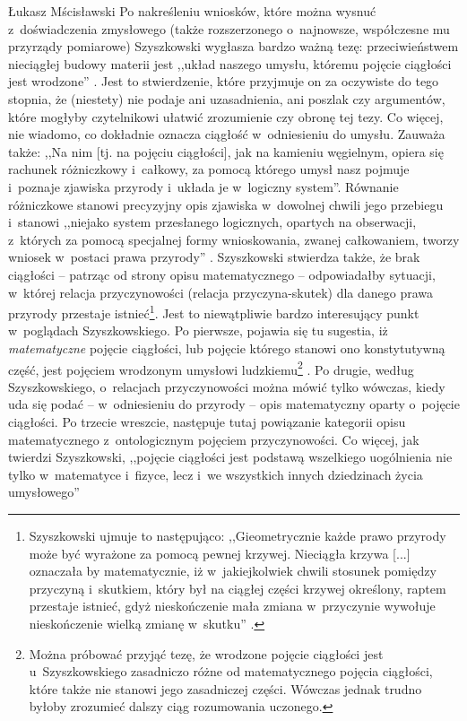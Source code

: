 \begin{artplenv}{Łukasz Mścisławski}
Po nakreśleniu wniosków, które można wysnuć z~doświadczenia zmysłowego (także rozszerzonego o~najnowsze, współczesne mu przyrządy pomiarowe) Szyszkowski wygłasza bardzo ważną tezę: przeciwieństwem nieciągłej budowy materii jest ,,układ naszego umysłu, któremu pojęcie ciągłości jest wrodzone''
\parencite[][s.~47]{szyszkowski_o_1916}. %
 Jest to stwierdzenie, które przyjmuje on za oczywiste do tego stopnia, że (niestety) nie podaje ani uzasadnienia, ani poszlak czy argumentów, które mogłyby czytelnikowi ułatwić zrozumienie czy obronę tej tezy. Co więcej, nie wiadomo, co dokładnie oznacza ciągłość w~odniesieniu do umysłu. Zauważa także: ,,Na nim [tj. na pojęciu ciągłości], jak na kamieniu węgielnym, opiera się rachunek różniczkowy i~całkowy, za pomocą którego umysł nasz pojmuje i~poznaje zjawiska przyrody i~układa je w~logiczny system''. Równanie różniczkowe stanowi precyzyjny opis zjawiska w~dowolnej chwili jego przebiegu i~stanowi ,,niejako system przesłanego logicznych, opartych na obserwacji, z~których za pomocą specjalnej formy wnioskowania, zwanej całkowaniem, tworzy wniosek w~postaci prawa przyrody'' 
\parencite[][s.~47]{szyszkowski_o_1916}. %
 Szyszkowski stwierdza także, że brak ciągłości -- patrząc od strony opisu matematycznego -- odpowiadałby sytuacji, w~której relacja przyczynowości (relacja przyczyna-skutek) dla danego prawa przyrody przestaje istnieć\footnote{Szyszkowski ujmuje to następująco: ,,Gieometrycznie każde prawo przyrody może być wyrażone za pomocą pewnej krzywej. Nieciągła krzywa [...] oznaczała by matematycznie, iż w~jakiejkolwiek chwili stosunek pomiędzy przyczyną i~skutkiem, który był na ciągłej części krzywej określony, raptem przestaje istnieć, gdyż nieskończenie mała zmiana w~przyczynie wywołuje nieskończenie wielką zmianę w~skutku'' 
\parencite[][s.~47]{szyszkowski_o_1916}.%
}. Jest to niewątpliwie bardzo interesujący punkt w~poglądach Szyszkowskiego. Po pierwsze, pojawia się tu sugestia, iż \textit{matematyczne} pojęcie ciągłości, lub pojęcie którego stanowi ono konstytutywną część, jest pojęciem wrodzonym umysłowi ludzkiemu\footnote{Można próbować przyjąć tezę, że wrodzone pojęcie ciągłości jest u~Szyszkowskiego zasadniczo różne od matematycznego pojęcia ciągłości, które także nie stanowi jego zasadniczej części. Wówczas jednak trudno byłoby zrozumieć dalszy ciąg rozumowania uczonego.} . Po drugie, według Szyszkowskiego, o~relacjach przyczynowości można mówić tylko wówczas, kiedy uda się podać -- w~odniesieniu do przyrody -- opis matematyczny oparty o~pojęcie ciągłości. Po trzecie wreszcie, następuje tutaj powiązanie kategorii opisu matematycznego z~ontologicznym pojęciem przyczynowości. Co więcej, jak twierdzi Szyszkowski, ,,pojęcie ciągłości jest podstawą wszelkiego uogólnienia nie tylko w~matematyce i~fizyce, lecz i~we wszystkich innych dziedzinach życia umysłowego'' 

\end{artplenv}

